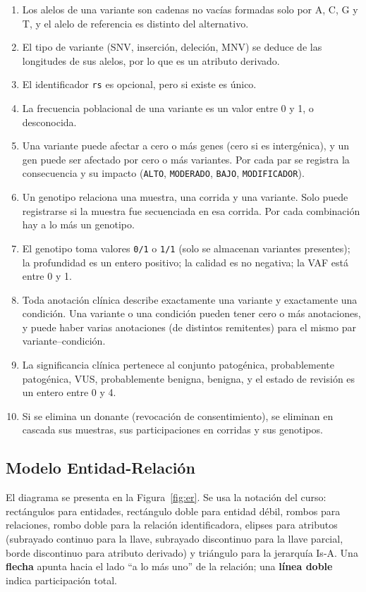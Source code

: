 \documentclass[11pt,a4paper]{article}
\newcommand{\tb}[1]{\texttt{#1}}
\begin{document}
\begin{enumerate}[label=\textbf{RS\arabic*.}]
  \item Los alelos de una variante son cadenas no vacías formadas solo por A, C, G y T, y el alelo de referencia es distinto del alternativo.
  \item El tipo de variante (SNV, inserción, deleción, MNV) se deduce de las longitudes de sus alelos, por lo que es un atributo derivado.
  \item El identificador \tb{rs} es opcional, pero si existe es único.
  \item La frecuencia poblacional de una variante es un valor entre 0 y 1, o desconocida.
  \item Una variante puede afectar a cero o más genes (cero si es intergénica), y un gen puede ser afectado por cero o más variantes. Por cada par se registra la consecuencia y su impacto (\tb{ALTO}, \tb{MODERADO}, \tb{BAJO}, \tb{MODIFICADOR}).
  \item Un genotipo relaciona una muestra, una corrida y una variante. Solo puede registrarse si la muestra fue secuenciada en esa corrida. Por cada combinación hay a lo más un genotipo.
  \item El genotipo toma valores \tb{0/1} o \tb{1/1} (solo se almacenan variantes presentes); la profundidad es un entero positivo; la calidad es no negativa; la VAF está entre 0 y 1.
  \item Toda anotación clínica describe exactamente una variante y exactamente una condición. Una variante o una condición pueden tener cero o más anotaciones, y puede haber varias anotaciones (de distintos remitentes) para el mismo par variante--condición.
  \item La significancia clínica pertenece al conjunto {patogénica, probablemente patogénica, VUS, probablemente benigna, benigna}, y el estado de revisión es un entero entre 0 y 4.
  \item Si se elimina un donante (revocación de consentimiento), se eliminan en cascada sus muestras, sus participaciones en corridas y sus genotipos.
\end{enumerate}

\subsection{Modelo Entidad-Relación}

El diagrama se presenta en la Figura~\ref{fig:er}. Se usa la notación del curso: rectángulos para entidades, rectángulo doble para entidad débil, rombos para relaciones, rombo doble para la relación identificadora, elipses para atributos (subrayado continuo para la llave, subrayado discontinuo para la llave parcial, borde discontinuo para atributo derivado) y triángulo para la jerarquía Is-A. Una \textbf{flecha} apunta hacia el lado ``a lo más uno'' de la relación; una \textbf{línea doble} indica participación total.
\end{document}
